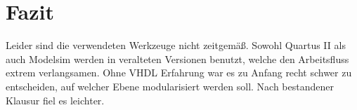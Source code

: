 \documentclass[a4paper,12pt]{report}
\begin{document}
\chapter{Fazit}
	Leider sind die verwendeten Werkzeuge nicht zeitgemäß. Sowohl Quartus II als auch Modelsim werden in veralteten Versionen benutzt, welche den Arbeitsfluss extrem verlangsamen.
	Ohne VHDL Erfahrung war es zu Anfang recht schwer zu entscheiden, auf welcher Ebene modularisiert werden soll. Nach bestandener Klausur fiel es leichter.
\end{document}
